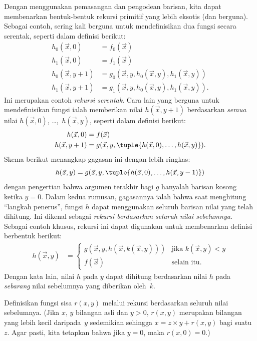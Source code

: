 \documentclass[../../../include/open-logic-section]{subfiles}
\begin{document}

Dengan menggunakan pemasangan dan pengodean barisan, kita dapat membenarkan
bentuk-bentuk rekursi primitif yang lebih eksotis (dan berguna). Sebagai
contoh, sering kali berguna untuk mendefinisikan dua fungsi secara serentak,
seperti dalam definisi berikut:
\begin{align*}
h_0(\vec x, 0) & = f_0(\vec x) \\
h_1(\vec x, 0) & = f_1(\vec x) \\
h_0(\vec x, y+1) & = g_0(\vec x, y, h_0(\vec x, y), h_1(\vec x, y)) \\
h_1(\vec x, y+1) & = g_1(\vec x, y, h_0(\vec x, y), h_1(\vec x, y)).
\end{align*}
Ini merupakan contoh \emph{rekursi serentak}. Cara lain yang berguna untuk
mendefinisikan fungsi ialah memberikan nilai $h(\vec x,y+1)$ berdasarkan
\emph{semua} nilai $h(\vec x,0)$, \dots,~$h(\vec x,y)$, seperti dalam
definisi berikut:
\begin{align*}
h(\vec x, 0) & = f(\vec x) \\
h(\vec x, y+1) & = g(\vec x, y, \tuple{h(\vec x, 0), \dots, h(\vec x, y)}).
\end{align*}
Skema berikut menangkap gagasan ini dengan lebih ringkas:
\[
h(\vec x, y) = g(\vec x, y, \tuple{h(\vec x, 0), \dots, h(\vec x, y-1)})
\]
dengan pengertian bahwa argumen terakhir bagi $g$ hanyalah barisan kosong
ketika $y=0$. Dalam kedua rumusan, gagasannya ialah bahwa saat menghitung
``langkah penerus'', fungsi $h$ dapat menggunakan seluruh barisan nilai yang
telah dihitung. Ini dikenal sebagai \emph{rekursi berdasarkan seluruh nilai
sebelumnya}. Sebagai contoh khusus, rekursi ini dapat digunakan untuk
membenarkan definisi berbentuk berikut:
\begin{align*}
h(\vec x, y) & = \begin{cases}
  g(\vec x, y, h(\vec x, k(\vec x, y))) & \text{jika $k(\vec x, y) < y$} \\
  f(\vec x) & \text{selain itu.}
\end{cases}
\end{align*}
Dengan kata lain, nilai $h$ pada $y$ dapat dihitung berdasarkan nilai $h$ pada
\emph{sebarang} nilai sebelumnya yang diberikan oleh~$k$.

\begin{prob}
  Definisikan fungsi sisa $r(x,y)$ melalui rekursi berdasarkan seluruh nilai
  sebelumnya. (Jika $x$, $y$ bilangan asli dan $y>0$, $r(x,y)$ merupakan
  bilangan yang lebih kecil daripada~$y$ sedemikian sehingga
  $x=z\times y+r(x,y)$ bagi suatu~$z$. Agar pasti, kita tetapkan bahwa jika
  $y=0$, maka $r(x,0)=0$.)
\end{prob}
\end{document}
